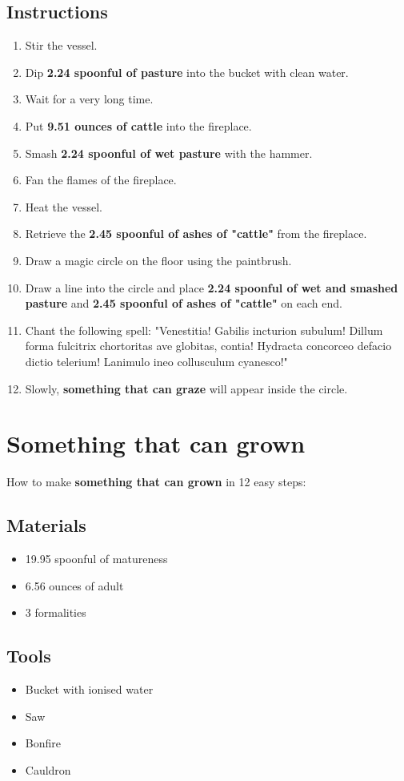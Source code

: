 \documentclass{article}
\begin{document}
\subsection{Instructions}\begin{enumerate}
\item 
Stir the vessel.
\item 
Dip \textbf{2.24 spoonful of pasture} into the bucket with clean water.
\item 
Wait for a very long time.
\item 
Put \textbf{9.51 ounces of cattle} into the fireplace.
\item 
Smash \textbf{2.24 spoonful of wet pasture} with the hammer.
\item 
Fan the flames of the fireplace.
\item 
Heat the vessel.
\item 
Retrieve the \textbf{2.45 spoonful of ashes of "cattle"} from the fireplace.
\item 
Draw a magic circle on the floor using the paintbrush.
\item 
Draw a line into the circle and place \textbf{2.24 spoonful of wet and smashed pasture} and \textbf{2.45 spoonful of ashes of "cattle"} on each end.
\item 
Chant the following spell: "Venestitia! Gabilis incturion subulum! Dillum forma fulcitrix chortoritas ave globitas, contia! Hydracta concorceo defacio dictio telerium! Lanimulo ineo collusculum cyanesco!"
\item 
Slowly, \textbf{something that can graze} will appear inside the circle.
\end{enumerate}
\newpage
\section{Something that can grown}How to make \textbf{something that can grown} in 12 easy steps:

\subsection{Materials}\begin{itemize}
\item 
19.95 spoonful of matureness
\item 
6.56 ounces of adult
\item 
3 formalities
\end{itemize}
\subsection{Tools}\begin{itemize}
\item 
Bucket with ionised water
\item 
Saw
\item 
Bonfire
\item 
Cauldron
\end{itemize}
\end{document}
